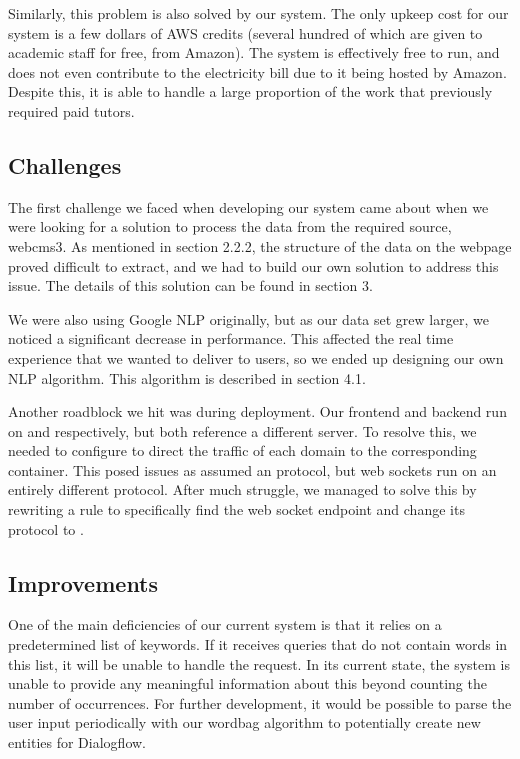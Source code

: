 Similarly, this problem is also solved by our system. The only upkeep cost for our system is a few dollars of AWS credits (several hundred of which are given to academic staff for free, from Amazon). The system is effectively free to run, and does not even contribute to the electricity bill due to it being hosted by Amazon. Despite this, it is able to handle a large proportion of the work that previously required paid tutors.

\subsection{Challenges}
The first challenge we faced when developing our system came about when we were looking for a solution to process the data from the required source, webcms3. As mentioned in section 2.2.2, the structure of the data on the webpage proved difficult to extract, and we had to build our own solution to address this issue. The details of this solution can be found in section 3.

We were also using Google NLP originally, but as our data set grew larger, we noticed a significant decrease in performance. This affected the real time experience that we wanted to deliver to users, so we ended up designing our own NLP algorithm. This algorithm is described in section 4.1.

Another roadblock we hit was during deployment. Our frontend and backend run on  and  respectively, but both reference a different server. To resolve this, we needed to configure  to direct the traffic of each domain to the corresponding  container. This posed issues as  assumed an  protocol, but web sockets run on an entirely different protocol. After much struggle, we managed to solve this by rewriting a rule to specifically find the web socket endpoint and change its protocol to .

\subsection{Improvements}
One of the main deficiencies of our current system is that it relies on a predetermined list of keywords. If it receives queries that do not contain words in this list, it will be unable to handle the request. In its current state, the system is unable to provide any meaningful information about this beyond counting the number of occurrences. For further development, it would be possible to parse the user input periodically with our wordbag algorithm to potentially create new entities for Dialogflow.

\newpage

